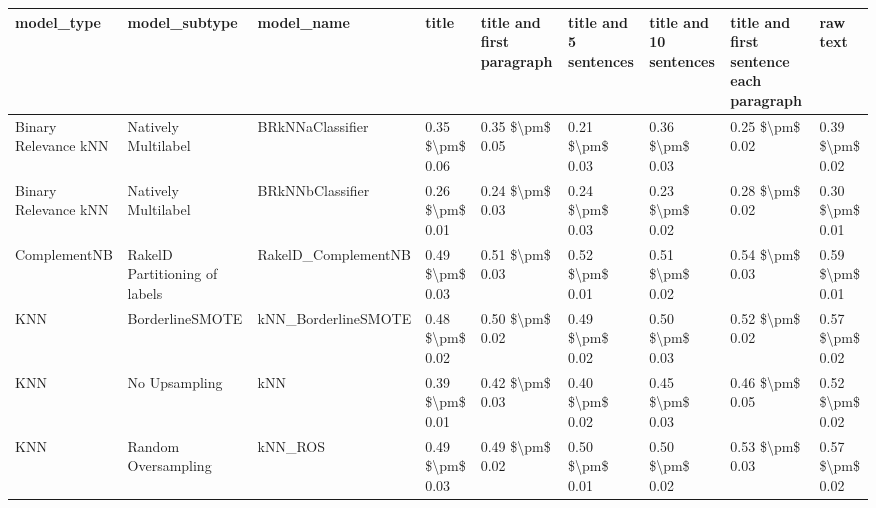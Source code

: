 \begin{tabular}{lllllllll}
\toprule
                     model\_type &                 model\_subtype &                                   model\_name &           title & title and first paragraph & title and 5 sentences & title and 10 sentences & title and first sentence each paragraph &            raw text \\
\midrule
           Binary Relevance kNN &           Natively Multilabel &                             BRkNNaClassifier & 0.35 \$\textbackslash pm\$ 0.06 &           0.35 \$\textbackslash pm\$ 0.05 &       0.21 \$\textbackslash pm\$ 0.03 &        0.36 \$\textbackslash pm\$ 0.03 &                         0.25 \$\textbackslash pm\$ 0.02 &     0.39 \$\textbackslash pm\$ 0.02 \\
           Binary Relevance kNN &           Natively Multilabel &                             BRkNNbClassifier & 0.26 \$\textbackslash pm\$ 0.01 &           0.24 \$\textbackslash pm\$ 0.03 &       0.24 \$\textbackslash pm\$ 0.03 &        0.23 \$\textbackslash pm\$ 0.02 &                         0.28 \$\textbackslash pm\$ 0.02 &     0.30 \$\textbackslash pm\$ 0.01 \\
                   ComplementNB & RakelD Partitioning of labels &                          RakelD\_ComplementNB & 0.49 \$\textbackslash pm\$ 0.03 &           0.51 \$\textbackslash pm\$ 0.03 &       0.52 \$\textbackslash pm\$ 0.01 &        0.51 \$\textbackslash pm\$ 0.02 &                         0.54 \$\textbackslash pm\$ 0.03 &     0.59 \$\textbackslash pm\$ 0.01 \\
                            KNN &               BorderlineSMOTE &                          kNN\_BorderlineSMOTE & 0.48 \$\textbackslash pm\$ 0.02 &           0.50 \$\textbackslash pm\$ 0.02 &       0.49 \$\textbackslash pm\$ 0.02 &        0.50 \$\textbackslash pm\$ 0.03 &                         0.52 \$\textbackslash pm\$ 0.02 &     0.57 \$\textbackslash pm\$ 0.02 \\
                            KNN &                 No Upsampling &                                          kNN & 0.39 \$\textbackslash pm\$ 0.01 &           0.42 \$\textbackslash pm\$ 0.03 &       0.40 \$\textbackslash pm\$ 0.02 &        0.45 \$\textbackslash pm\$ 0.03 &                         0.46 \$\textbackslash pm\$ 0.05 &     0.52 \$\textbackslash pm\$ 0.02 \\
                            KNN &           Random Oversampling &                                      kNN\_ROS & 0.49 \$\textbackslash pm\$ 0.03 &           0.49 \$\textbackslash pm\$ 0.02 &       0.50 \$\textbackslash pm\$ 0.01 &        0.50 \$\textbackslash pm\$ 0.02 &                         0.53 \$\textbackslash pm\$ 0.03 &     0.57 \$\textbackslash pm\$ 0.02 \\

\end{tabular}
